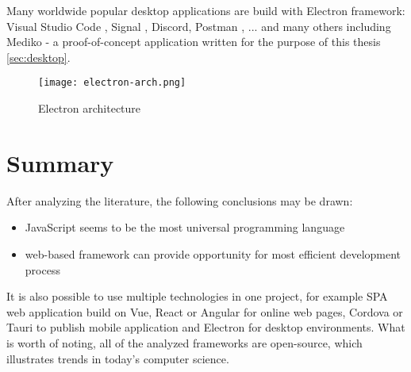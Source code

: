 Many worldwide popular desktop applications are build with Electron framework: Visual Studio Code \autocite{Vscode}, Signal \autocite{Signal}, Discord, Postman \autocite{Postman}, ... and many others including Mediko - a proof-of-concept application written for the purpose of this thesis \ref{sec:desktop}.

\begin{figure}[H]
    \centering
    \texttt{[image: electron-arch.png]}
    \caption[Electron architecture]{\label{fig:electronarch} Electron architecture \autocite{ElectronArch} }
\end{figure}



\section{{Summary}}%
\label{sec:literature_summary}

After analyzing the literature, the following conclusions may be drawn:
\begin{itemize}
    \item JavaScript seems to be the most universal programming language
    \item web-based framework can provide opportunity for most efficient development process
\end{itemize}

It is also possible to use multiple technologies in one project, for example SPA web application build on Vue, React or Angular for online web pages, Cordova or Tauri to publish mobile application and Electron for desktop environments. 
What is worth of noting, all of the analyzed frameworks are open-source, which illustrates trends in today's computer science.


